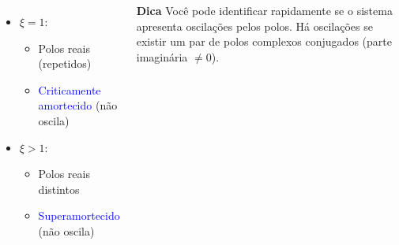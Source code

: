 \begin{frame}
\begin{columns}
\begin{itemize}
      \item $\xi = 1$:
            \begin{itemize}
              \item Polos reais (repetidos)
              \item \textcolor{blue}{Criticamente amortecido} (não oscila)
            \end{itemize}
      \item $\xi > 1$:
            \begin{itemize}
              \item Polos reais distintos
              \item \textcolor{blue}{Superamortecido} (não oscila)
            \end{itemize}
    \end{itemize}
    \begin{block}{\textbf{Dica}}
      Você pode identificar rapidamente se o sistema apresenta oscilações pelos polos. Há oscilações se existir um par de polos complexos conjugados (parte imaginária $\neq 0$).
    \end{block}
  \end{columns}
\end{frame}

